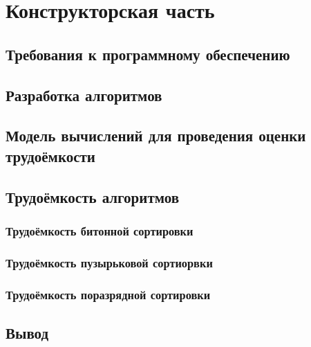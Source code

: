 \section{Конструкторская часть}


\subsection{Требования к программному обеспечению}


\subsection{Разработка алгоритмов}


\subsection{Модель вычислений для проведения оценки трудоёмкости}


\subsection{Трудоёмкость алгоритмов}


\subsubsection{Трудоёмкость битонной сортировки}

\subsubsection{Трудоёмкость пузырьковой сортиорвки}

\subsubsection{Трудоёмкость поразрядной сортировки}

\subsection*{Вывод}

